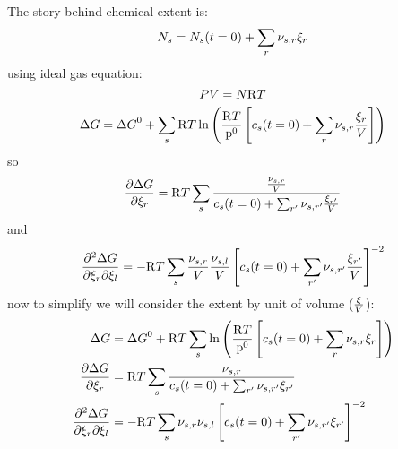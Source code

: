 The story behind chemical extent is:
\begin{equation}
\Mol[s] = \Mol[s](t=0) + \sum_r \scoef[s,r] \ext[r]
\end{equation}
using ideal gas equation:
\begin{equation}
\Press \Vol = \Mol \Rg \Temp
\end{equation}
\begin{equation}
\DGibbs = \DGibbsZ + \sum_s\Rg \Temp \ln\left(\frac{\Rg \Temp}{\pz}
                                                \left[\conc_s(t=0) +
                                                           \sum_r\scoef[s,r]\frac{\ext[r]}{\Vol}
                                                \right]
                                        \right)
\end{equation}
so
\begin{equation}
\doverdext[r]{\DGibbs} = \Rg\Temp \sum_s\frac{\frac{\scoef[s,r]}{\Vol}}
                                             {\conc_s(t=0) + \sum_{r'} \scoef[s,r']\frac{\ext[r']}{\Vol}}
\end{equation}
and
\begin{equation}
\ddoverddext{\DGibbs}{r}{l} = -\Rg\Temp \sum_s\frac{\scoef[s,r]}{\Vol}\frac{\scoef[s,l]}{\Vol}
                                        \left[\conc_s(t=0) + \sum_{r'}\scoef[s,r']\frac{\ext[r']}{\Vol}\right]^{-2}
\end{equation}
now to simplify we will consider the extent by unit of volume ($\frac{\ext}{\Vol}$):
\begin{equation}
\begin{split}
\DGibbs & =  \DGibbsZ + \Rg\Temp \sum_s \ln\left(\frac{\Rg\Temp}{\pz}\left[\conc_s(t=0) + \sum_r\scoef[s,r]\ext[r]\right]\right) \\
\doverdext[r]{\DGibbs} & = \Rg\Temp \sum_s\frac{\scoef[s,r]}{\conc_s(t=0) + \sum_{r'} \scoef[s,r']\ext[r']} \\
\ddoverddext{\DGibbs}{r}{l} & =  -\Rg\Temp \sum_s\scoef[s,r]\scoef[s,l]\left[\conc_s(t=0) + \sum_{r'}\scoef[s,r']\ext[r']\right]^{-2}
\end{split}
\end{equation}
